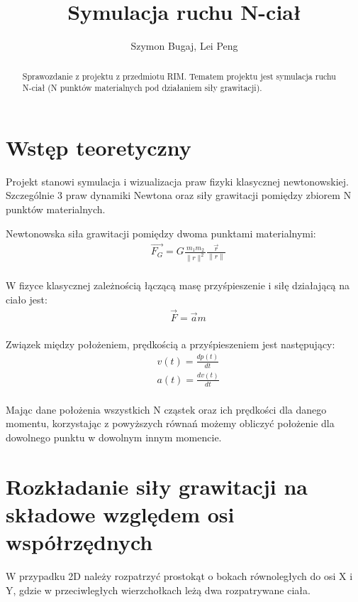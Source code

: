 \documentclass[fleqn]{article}
\begin{document}
\title{Symulacja ruchu N-ciał}
\author{Szymon Bugaj, Lei Peng}

\maketitle

\begin{abstract}
Sprawozdanie z projektu z przedmiotu RIM.
Tematem projektu jest symulacja ruchu N-ciał 
(N punktów materialnych pod działaniem siły grawitacji).
\end{abstract}

\tableofcontents



\section{Wstęp teoretyczny}
Projekt stanowi symulacja i wizualizacja praw fizyki klasycznej newtonowskiej. Szczególnie 3 praw dynamiki Newtona oraz siły grawitacji pomiędzy zbiorem N punktów materialnych.

Newtonowska siła grawitacji pomiędzy dwoma punktami materialnymi:
\begin{align*}
    &\vec{F_{G}} = G\frac{m_{1} m_{2}}{\|r\|^{2}}\frac{\vec{r}}{\|r\|} \\
\end{align*}

W fizyce klasycznej zależnością łączącą masę przyśpieszenie i siłę działającą na ciało jest:
\begin{align*}
    &\vec{F} = \vec{a}m \\
\end{align*}

Związek między położeniem, prędkością a przyśpieszeniem jest następujący:
\begin{align*}
    &v(t) = \frac{dp(t)}{dt} \\
    &a(t) = \frac{dv(t)}{dt} \\
\end{align*}

Mając dane położenia wszystkich N cząstek oraz ich prędkości dla danego momentu,
korzystając z powyższych równań możemy obliczyć położenie dla dowolnego punktu w dowolnym innym momencie.

\section{Rozkładanie siły grawitacji na składowe względem osi współrzędnych}
W przypadku 2D należy rozpatrzyć prostokąt o bokach równoległych do osi X i Y, gdzie w przeciwległych
wierzchołkach leżą dwa rozpatrywane ciała.
\end{document}
